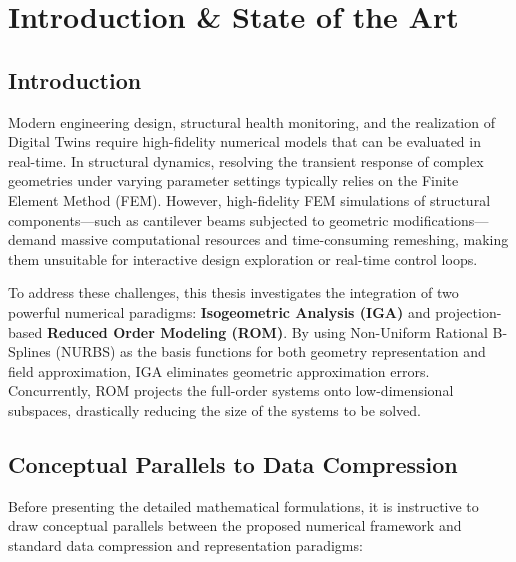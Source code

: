 \chapter{Introduction \& State of the Art}
\label{ch:intro}

\section{Introduction}
Modern engineering design, structural health monitoring, and the realization of Digital Twins require high-fidelity numerical models that can be evaluated in real-time. In structural dynamics, resolving the transient response of complex geometries under varying parameter settings typically relies on the Finite Element Method (FEM). However, high-fidelity FEM simulations of structural components—such as cantilever beams subjected to geometric modifications—demand massive computational resources and time-consuming remeshing, making them unsuitable for interactive design exploration or real-time control loops.

To address these challenges, this thesis investigates the integration of two powerful numerical paradigms: \textbf{Isogeometric Analysis (IGA)} and projection-based \textbf{Reduced Order Modeling (ROM)}. By using Non-Uniform Rational B-Splines (NURBS) as the basis functions for both geometry representation and field approximation, IGA eliminates geometric approximation errors. Concurrently, ROM projects the full-order systems onto low-dimensional subspaces, drastically reducing the size of the systems to be solved.

\section{Conceptual Parallels to Data Compression}
Before presenting the detailed mathematical formulations, it is instructive to draw conceptual parallels between the proposed numerical framework and standard data compression and representation paradigms:

